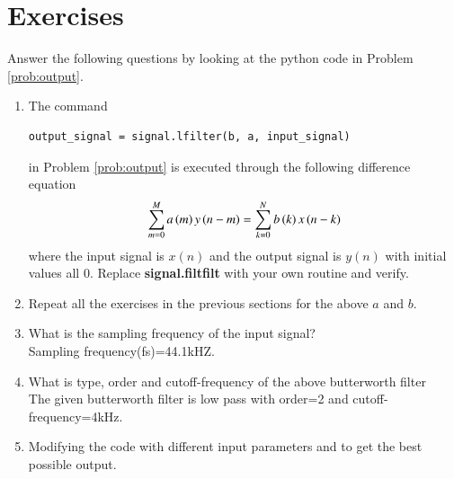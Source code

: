 \documentclass[journal,12pt,twocolumn]{IEEEtran}
\renewcommand\thesection{\arabic{section}}
\begin{document}
	\section{Exercises}
	
	Answer the following questions by looking at the python code in Problem \ref{prob:output}.
	\begin{enumerate}[label=\thesection.\arabic*]
		\item
		The command
		\begin{lstlisting}
output_signal = signal.lfilter(b, a, input_signal)
		\end{lstlisting}
		in Problem \ref{prob:output} is executed through the following difference equation
		\begin{equation}
			\label{eq:iir_filter_gen}
			\sum _{m=0}^{M}a\left(m\right)y\left(n-m\right)=\sum _{k=0}^{N}b\left(k\right)x\left(n-k\right)
		\end{equation}
		where the input signal is $x(n)$ and the output signal is $y(n)$ with initial values all 0. Replace
		\textbf{signal.filtfilt} with your own routine and verify.
		\item Repeat all the exercises in the previous sections for the above $a$ and $b$.
		
		\item What is the sampling frequency of the input signal?
		\\
		\solution
		Sampling frequency(fs)=44.1kHZ.
		\item
		What is type, order and  cutoff-frequency of the above butterworth filter
		\\
		\solution
		The given butterworth filter is low pass with order=2 and cutoff-frequency=4kHz.
		\item
		Modifying the code with different input parameters and to get the best possible output.
	\end{enumerate}
	
\end{document}
